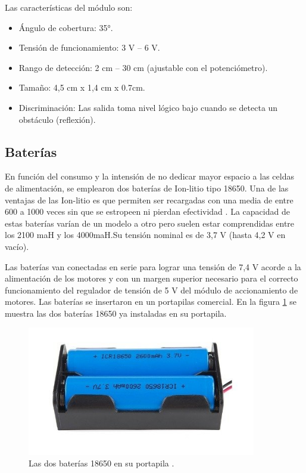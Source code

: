 Las características del módulo son:
\begin{itemize}
	\item Ángulo de cobertura: 35°.
	\item Tensión de funcionamiento: 3 V – 6 V.
	\item Rango de detección: 2 cm – 30 cm (ajustable con el potenciómetro).
	\item Tamaño: 4,5 cm x 1,4 cm x 0.7cm. 
	\item Discriminación: Las salida toma nivel lógico bajo cuando se detecta un obstáculo (reflexión).
\end{itemize}



\subsection{Baterías}

En función del consumo y la intensión de no dedicar mayor espacio a las celdas de alimentación, se emplearon dos baterías de Ion-litio tipo 18650. Una de las ventajas de las Ion-litio es que permiten ser recargadas con una media de entre 600 a 1000 veces sin que se estropeen ni pierdan efectividad \citep{18650}. La capacidad de estas baterías varían de un modelo a otro pero suelen estar comprendidas entre los 2100 maH y los 4000maH.Su tensión nominal es de 3,7 V (hasta 4,2 V en vacío).

Las baterías van conectadas en serie para lograr una tensión de 7,4 V acorde a la alimentación de los motores y con un margen superior necesario para el correcto funcionamiento del regulador de tensión de 5 V del módulo de accionamiento de motores. 
Las baterías se insertaron en un portapilas comercial. En la figura \ref{fig:portapila} se muestra las dos baterías 18650 ya instaladas en su portapila.


\begin{figure}[h]
	\centering
	\includegraphics[width=10cm]{./Figures/portapilas.PNG}
	\caption{Las dos baterías 18650 en su portapila .}
	\label{fig:portapila}
\end{figure}


